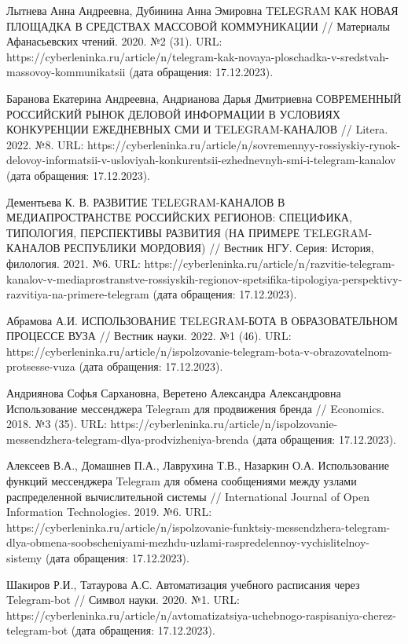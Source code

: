\documentclass{article}
\begin{document}
Лытнева Анна Андреевна, Дубинина Анна Эмировна TELEGRAM КАК НОВАЯ ПЛОЩАДКА В СРЕДСТВАХ МАССОВОЙ КОММУНИКАЦИИ // Материалы Афанасьевских чтений. 2020. №2 (31). URL: https://cyberleninka.ru/article/n/telegram-kak-novaya-ploschadka-v-sredstvah-massovoy-kommunikatsii (дата обращения: 17.12.2023).

Баранова Екатерина Андреевна, Андрианова Дарья Дмитриевна СОВРЕМЕННЫЙ РОССИЙСКИЙ РЫНОК ДЕЛОВОЙ ИНФОРМАЦИИ В УСЛОВИЯХ КОНКУРЕНЦИИ ЕЖЕДНЕВНЫХ СМИ И TELEGRAM-КАНАЛОВ // Litera. 2022. №8. URL: https://cyberleninka.ru/article/n/sovremennyy-rossiyskiy-rynok-delovoy-informatsii-v-usloviyah-konkurentsii-ezhednevnyh-smi-i-telegram-kanalov (дата обращения: 17.12.2023).

Дементьева К. В. РАЗВИТИЕ TELEGRAM-КАНАЛОВ В МЕДИАПРОСТРАНСТВЕ РОССИЙСКИХ РЕГИОНОВ: СПЕЦИФИКА, ТИПОЛОГИЯ, ПЕРСПЕКТИВЫ РАЗВИТИЯ (НА ПРИМЕРЕ TELEGRAM-КАНАЛОВ РЕСПУБЛИКИ МОРДОВИЯ) // Вестник НГУ. Серия: История, филология. 2021. №6. URL: https://cyberleninka.ru/article/n/razvitie-telegram-kanalov-v-mediaprostranstve-rossiyskih-regionov-spetsifika-tipologiya-perspektivy-razvitiya-na-primere-telegram (дата обращения: 17.12.2023).

Абрамова А.И. ИСПОЛЬЗОВАНИЕ TELEGRAM-БОТА В ОБРАЗОВАТЕЛЬНОМ ПРОЦЕССЕ ВУЗА // Вестник науки. 2022. №1 (46). URL: https://cyberleninka.ru/article/n/ispolzovanie-telegram-bota-v-obrazovatelnom-protsesse-vuza (дата обращения: 17.12.2023).

Андриянова Софья Сархановна, Веретено Александра Александровна Использование мессенджера Telegram для продвижения бренда // Economics. 2018. №3 (35). URL: https://cyberleninka.ru/article/n/ispolzovanie-messendzhera-telegram-dlya-prodvizheniya-brenda (дата обращения: 17.12.2023).

Алексеев В.А., Домашнев П.А., Лаврухина Т.В., Назаркин О.А. Использование функций мессенджера Telegram для обмена сообщениями между узлами распределенной вычислительной системы // International Journal of Open Information Technologies. 2019. №6. URL: https://cyberleninka.ru/article/n/ispolzovanie-funktsiy-messendzhera-telegram-dlya-obmena-soobscheniyami-mezhdu-uzlami-raspredelennoy-vychislitelnoy-sistemy (дата обращения: 17.12.2023).

Шакиров Р.И., Татаурова А.С. Автоматизация учебного расписания через Telegram-bot // Символ науки. 2020. №1. URL: https://cyberleninka.ru/article/n/avtomatizatsiya-uchebnogo-raspisaniya-cherez-telegram-bot (дата обращения: 17.12.2023).
\end{document}
